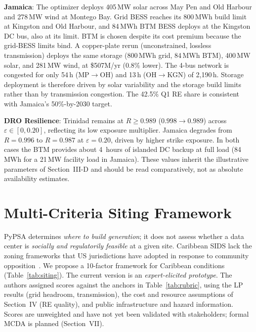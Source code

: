 \documentclass[conference,10pt]{IEEEtran}
\begin{document}
\textbf{Jamaica}: The optimizer deploys 405\,MW solar across May Pen and Old Harbour and 278\,MW wind at Montego Bay. Grid BESS reaches its 800\,MWh build limit at Kingston and Old Harbour, and 84\,MWh BTM BESS deploys at the Kingston DC bus, also at its limit. BTM is chosen despite its cost premium because the grid-BESS limits bind. A copper-plate rerun (unconstrained, lossless transmission) deploys the same storage (800\,MWh grid, 84\,MWh BTM), 400\,MW solar, and 281\,MW wind, at \$507M/yr (0.8\% lower). The 4-bus network is congested for only 54\,h (MP$\rightarrow$OH) and 13\,h (OH$\rightarrow$KGN) of 2{,}190\,h. Storage deployment is therefore driven by solar variability and the storage build limits rather than by transmission congestion. The 42.5\% Q1 RE share is consistent with Jamaica's 50\%-by-2030 target.

\textbf{DRO Resilience}: Trinidad remains at $R \geq 0.989$ ($0.998\rightarrow0.989$) across $\varepsilon\in[0,0.20]$, reflecting its low exposure multiplier. Jamaica degrades from $R = 0.996$ to $R = 0.987$ at $\varepsilon = 0.20$, driven by higher strike exposure. In both cases the BTM provides about 4~hours of islanded DC backup at full load (84\,MWh for a 21\,MW facility load in Jamaica). These values inherit the illustrative parameters of Section~III-D and should be read comparatively, not as absolute availability estimates.

\section{Multi-Criteria Siting Framework}

PyPSA determines \emph{where to build generation}; it does not assess whether a data center is \emph{socially and regulatorily feasible} at a given site. Caribbean SIDS lack the zoning frameworks that US jurisdictions have adopted in response to community opposition~\cite{dcwatch2025,stafford2025,albemarle2025,ramboll2024}. We propose a 10-factor framework for Caribbean conditions (Table~\ref{tab:siting}). The current version is an \emph{expert-elicited prototype}. The authors assigned scores against the anchors in Table~\ref{tab:rubric}, using the LP results (grid headroom, transmission), the cost and resource assumptions of Section~IV (RE quality), and public infrastructure and hazard information. Scores are unweighted and have not yet been validated with stakeholders; formal MCDA is planned (Section~VII).
\end{document}
